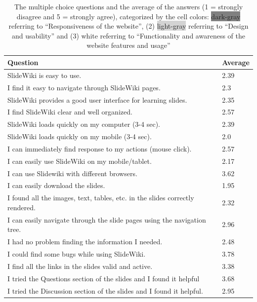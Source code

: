 \documentclass[ngerman,UKenglish,table]{scrbook}
\begin{document}
\begin{table}[!h]
\centering

\begin{tabularx}{0.9\columnwidth}{ l l }    
    \toprule
    
    \textbf{Question} & \textbf{Average} \\
    \midrule
    \rowcolor{LightGray}
    SlideWiki is easy to use. & 2.39 \\
	\midrule
	\rowcolor{LightGray}
    I find it easy to navigate through SlideWiki pages. & 2.3 \\
    \midrule
    \rowcolor{LightGray}
    SlideWiki provides a good user interface for learning slides. & 2.35 \\
    \midrule
    \rowcolor{LightGray}
    I find SlideWiki clear and well organized. & 2.57 \\
    \midrule
    \rowcolor{Gray}
    SlideWiki loads quickly on my computer (3-4 sec). & 2.39 \\
    \midrule
    \rowcolor{Gray}
    SlideWiki loads quickly on my mobile (3-4 sec). & 2.0 \\
    \midrule
    \rowcolor{Gray}
    I can immediately find response to my actions (mouse click). & 2.57 \\
    \midrule
    \rowcolor{LightGray}
    I can easily use SlideWiki on my mobile/tablet. & 2.17 \\
    \midrule
    \rowcolor{LightGray}
    I can use Slidewiki with different browsers. & 3.62 \\
    \rowcolor{Gray}
    \midrule
    I can easily download the slides. & 1.95 \\
    \midrule
    I found all the images, text, tables, etc. in the slides correctly rendered. & 2.32 \\
    \midrule
    \rowcolor{LightGray}
    I can easily navigate through the slide pages using the navigation tree. & 2.96 \\
    \midrule
    \rowcolor{LightGray}
    I had no problem finding the information I needed. & 2.48 \\
    \midrule
    I could find some bugs while using SlideWiki. & 3.78 \\
    \midrule
    I find all the links in the slides valid and active. & 3.38 \\
    \midrule
    I tried the Questions section of the slides and I found it helpful & 3.68 \\
    \midrule
    I tried the Discussion section of the slides and I found it helpful. & 2.95 \\
	\bottomrule
    \end{tabularx}
\caption{The multiple choice questions and the average of the answers (1 = strongly disagree and 5 = strongly agree), categorized by the cell colors: \colorbox{Gray}{dark-gray} referring to “Responsiveness of the website”, (2) \colorbox{LightGray}{light-gray} referring to “Design and usability” and (3) white referring to “Functionality and awareness of the website features and usage”}
\label{tab:bonn_evaluation}
\end{table}
\end{document}
